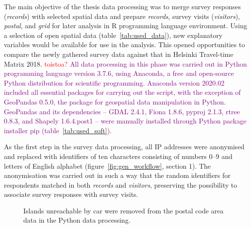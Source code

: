 The main objective of the thesis data processing was to merge survey responses (\textit{records}) with selected spatial data and prepare \textit{records}, survey visits (\textit{visitors}), \textit{postal}, and \textit{grid} for later analysis in R programming language environment. Using a selection of open spatial data (table~\ref{tab:used_data}), new explanatory variables would be available for use in the analysis. This opened opportunities to compare the newly gathered survey data against that in Helsinki Travel-time Matrix 2018. \textcolor{red}{toistoa?} \textcolor{purple}{All data processing in this phase was carried out in Python programming language version 3.7.6, using Anaconda, a free and open-source Python distribution for scientific programming. Anaconda version 2020.02 included all essential packages for carrying out the script, with the exception of GeoPandas 0.5.0, the package for geospatial data manipulation in Python. GeoPandas and its dependencies -- GDAL 2.4.1, Fiona 1.8.6, pyproj 2.1.3, rtree 0.8.3, and Shapely 1.6.4.post1 -- were manually installed through Python package installer pip (table~\ref{tab:used_soft})}.

As the first step in the survey data processing, all IP addresses were anonymised and replaced with identifiers of ten characters consisting of numbers 0--9 and letters of English alphabet (figure~\ref{fig:gen_workflow}, section 1). The anonymisation was carried out in such a way that the random identifiers for respondents matched in both \textit{records} and \textit{visitors}, preserving the possibility to associate survey responses with survey visits. 

\begin{figure}[H]%
    \centering
    \quad
    \caption[Process to remove islands not reachable by car]{Islands unreachable by car were removed from the postal code area data in the Python data processing.}%
    \label{fig:paavo_resarea}%
\end{figure}

